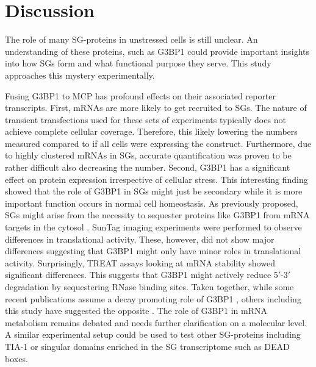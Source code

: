 \chapter{Discussion}


The role of many SG-proteins in unstressed cells is still unclear.
An understanding of these proteins, such as G3BP1 could provide important insights into how SGs form and what functional purpose they serve.
This study approaches this mystery experimentally.

Fusing G3BP1 to MCP has profound effects on their associated reporter transcripts.
First, mRNAs are more likely to get recruited to SGs.
The nature of transient transfections used for these sets of experiments typically does not achieve complete cellular coverage.
Therefore, this likely lowering the numbers measured compared to if all cells were expressing the construct.
Furthermore, due to highly clustered mRNAs in SGs, accurate quantification was proven to be rather difficult also decreasing the number.
Second, G3BP1 has a significant effect on protein expression irrespective of cellular stress.
This interesting finding showed that the role of G3BP1 in SGs might just be secondary while it is more important function occurs in normal cell homeostasis.
As previously proposed, SGs might arise from the necessity to sequester proteins like G3BP1 from mRNA targets in the cytosol \cite{fischer_structure-mediated_2020}.
SunTag imaging experiments were performed to observe differences in translational activity.
These, however, did not show major differences suggesting that G3BP1 might only have minor roles in translational activity.
Surprisingly, TREAT assays looking at mRNA stability showed significant differences.
This suggests that G3BP1 might actively reduce 5$'$-3$'$ degradation by sequestering RNase binding sites.
Taken together, while some recent publications assume a decay promoting role of G3BP1 \cite{fischer_structure-mediated_2020, tourriere_rasgap-associated_2001}, others including this study have suggested the opposite \cite{aulas_g3bp1_2015, bley_stress_2015, laver_rna-binding_2020}.
The role of G3BP1 in mRNA metabolism remains debated and needs further clarification on a molecular level.
A similar experimental setup could be used to test other SG-proteins including TIA-1 or singular domains enriched in the SG transcriptome such as DEAD boxes.

